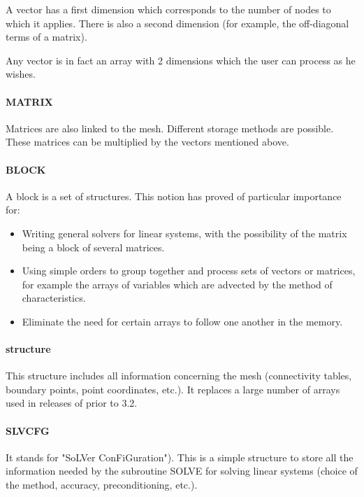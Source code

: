 A vector has a first dimension which corresponds to the number of nodes to
which it applies. There is also a second dimension (for example, the
off-diagonal terms of a matrix).

Any vector is in fact an array with 2 dimensions which the user can process as
he wishes.

\paragraph{MATRIX}

Matrices are also linked to the mesh. Different storage methods are possible.
These matrices can be multiplied by the vectors mentioned above.

\paragraph{BLOCK}

A block is a set of structures. This notion has proved of particular importance for:
\begin{itemize}
\item Writing general solvers for linear systems, with the possibility of the
  matrix being a block of several matrices.
\item Using simple orders to group together and process sets of vectors or
  matrices, for example the arrays of variables which are advected by the
  method of characteristics.
\item Eliminate the need for certain arrays to follow one another in the
  memory.
\end{itemize}

\paragraph{ structure}

This structure includes all information concerning the mesh (connectivity
tables, boundary points, point coordinates, etc.). It replaces a large number
of arrays used in releases of \bief prior to 3.2.

\paragraph{SLVCFG}

It stands for "SoLVer ConFiGuration"). This is a simple structure to store all
the information needed by the subroutine SOLVE for solving linear systems
(choice of the method, accuracy, preconditioning, etc.).

